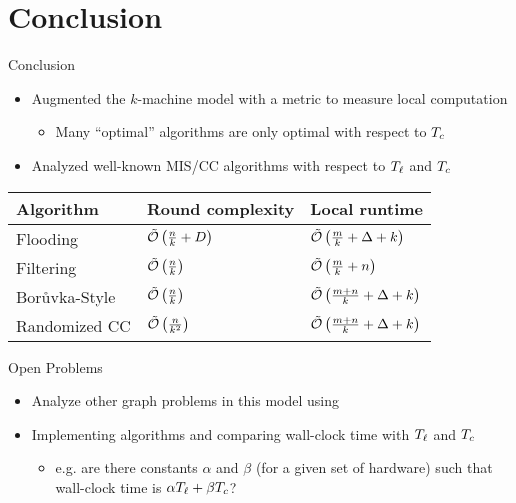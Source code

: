 \section{Conclusion}

\begin{frame}{Conclusion}
    \begin{itemize}
        \item Augmented the $k$-machine model with a metric to measure local computation 
        \begin{itemize}
            \item Many ``optimal'' algorithms are only optimal with respect to $T_c$
        \end{itemize}
        \item Analyzed well-known MIS/CC algorithms with respect to $T_{\ell}$ and $T_c$ 
    \end{itemize}
    \begin{tabular}{@{}lll@{}}\toprule
        Algorithm                  & Round complexity          & Local runtime                        \\\midrule
        Flooding                   & $\tilde{\mathcal{O}}\left(\frac{n}{k} + D\right)$ & $\tilde{\mathcal{O}}\left(\frac{m}{k} + \Delta + k\right)$   \\
        Filtering                  & $\tilde{\mathcal{O}}\left(\frac{n}{k}\right)$     & $\tilde{\mathcal{O}}\left(\frac{m}{k} + n\right)$            \\
        Bor\r{u}vka-Style & $\tilde{\mathcal{O}}\left(\frac{n}{k}\right)$     & $\tilde{\mathcal{O}}\left(\frac{m+n}{k} + \Delta + k\right)$ \\
        Randomized CC              & $\tilde{\mathcal{O}}\left(\frac{n}{k^2}\right)$   & $\tilde{\mathcal{O}}\left(\frac{m+n}{k} + \Delta + k\right)$
    \end{tabular}
\end{frame}

\begin{frame}{Open Problems}
    \begin{itemize}
        \item Analyze other graph problems in this model using 
        \item Implementing algorithms and comparing wall-clock time with $T_{\ell}$ and $T_c$
        \begin{itemize}
            \item e.g. are there constants $\alpha$ and $\beta$ (for a given set of hardware)
            such that wall-clock time is $\alpha T_{\ell} + \beta T_c$?
        \end{itemize}
    \end{itemize}
\end{frame}